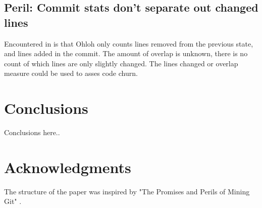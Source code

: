 \documentclass{sig-alternate}
\begin{document}
\subsection{Peril: Commit stats don't separate out changed lines}
Encountered in \cite{Deshpande:2008p4463} is that Ohloh only counts lines removed from the previous state, and lines added in the commit. The amount of overlap is unknown, there is no count of which lines are only slightly changed. The lines changed or overlap measure could be used to asses code churn.


\section{Conclusions}
Conclusions here..


\section{Acknowledgments}
The structure of the paper was inspired by "The Promises and Perils of Mining Git" \cite{Bird:2009p4462}.




\end{document}
